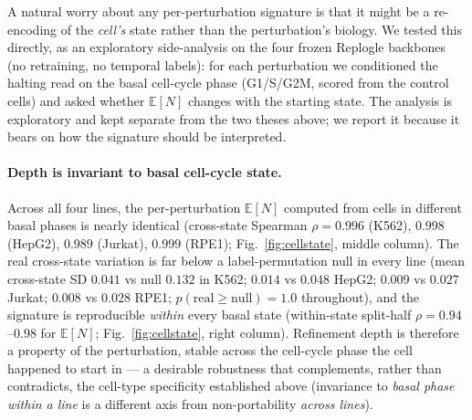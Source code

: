 \documentclass[11pt]{article}
\newcommand{\EN}{\ensuremath{\mathbb{E}[N]}}
\let\mathrho\rho
\renewcommand{\rho}{\ensuremath{\mathrho}}
\begin{document}
A natural worry about any per-perturbation signature is that it might be a re-encoding of the
\emph{cell's} state rather than the perturbation's biology. We tested this directly, as an
exploratory side-analysis on the four frozen Replogle backbones (no retraining, no temporal labels):
for each perturbation we conditioned the halting read on the basal cell-cycle phase (G1/S/G2M,
scored from the control cells) and asked whether \EN{} changes with the starting state. The analysis
is exploratory and kept separate from the two theses above; we report it because it bears on how the
signature should be interpreted.

\paragraph{Depth is invariant to basal cell-cycle state.} Across all four lines, the
per-perturbation \EN{} computed from cells in different basal phases is nearly identical
(cross-state Spearman \rho{}$=0.996$ (K562), $0.998$ (HepG2), $0.989$ (Jurkat), $0.999$ (RPE1);
Fig.~\ref{fig:cellstate}, middle column). The real cross-state variation is far below a
label-permutation null in every line (mean cross-state SD $0.041$ vs null $0.132$ in K562; $0.014$
vs $0.048$ HepG2; $0.009$ vs $0.027$ Jurkat; $0.008$ vs $0.028$ RPE1; $p(\text{real}\geq\text{null})=1.0$
throughout), and the signature is reproducible \emph{within} every basal state (within-state
split-half \rho{}$=0.94$--$0.98$ for \EN{}; Fig.~\ref{fig:cellstate}, right column). Refinement depth
is therefore a property of the perturbation, stable across the cell-cycle phase the cell happened to
start in --- a desirable robustness that complements, rather than contradicts, the cell-type
specificity established above (invariance to \emph{basal phase within a line} is a different axis from
non-portability \emph{across lines}).
\end{document}
